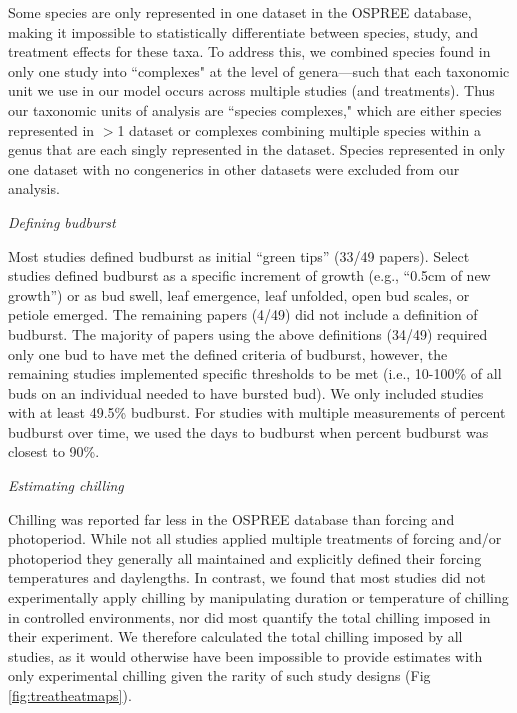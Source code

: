 \documentclass{article}
\begin{document}
\par Some species are only represented in one dataset in the OSPREE database, making it impossible to statistically differentiate between species, study, and treatment effects for these taxa. To address this, we combined species found in only one study into ``complexes" at the level of genera---such that each taxonomic unit we use in our model occurs across multiple studies (and treatments). Thus our taxonomic units of analysis are ``species complexes," which are either species represented in $>$1 dataset or complexes combining multiple species within a genus that are each singly represented in the dataset. Species represented in only one dataset with no congenerics in other datasets were excluded from our analysis.

\par \emph{Defining budburst}

Most studies defined budburst as initial ``green tips'' (33/49 papers). Select studies defined budburst as a specific increment of growth (e.g., ``0.5cm of new growth'') or as bud swell, leaf emergence, leaf unfolded, open bud scales, or petiole emerged. The remaining papers (4/49) did not include a definition of budburst. The majority of papers using the above definitions (34/49) required only one bud to have met the defined criteria of budburst, however, the remaining studies implemented specific thresholds to be met (i.e., 10-100\% of all buds on an individual needed to have bursted bud). We only included studies with at least 49.5\% budburst. For studies with multiple measurements of percent budburst over time, we used the days to budburst when percent budburst was closest to 90\%.

\par{\emph{Estimating chilling}}

Chilling was reported far less in the OSPREE database than forcing and photoperiod. While not all studies applied multiple treatments of forcing and/or photoperiod they generally all maintained and explicitly defined their forcing temperatures and daylengths. In contrast, we found that most studies did not experimentally apply chilling by manipulating duration or temperature of chilling in controlled environments, nor did most quantify the total chilling imposed in their experiment. We therefore calculated the total chilling imposed by all studies, as it would otherwise have been impossible to provide estimates with only experimental chilling given the rarity of such study designs (Fig \ref{fig:treatheatmaps}). 
\end{document}
